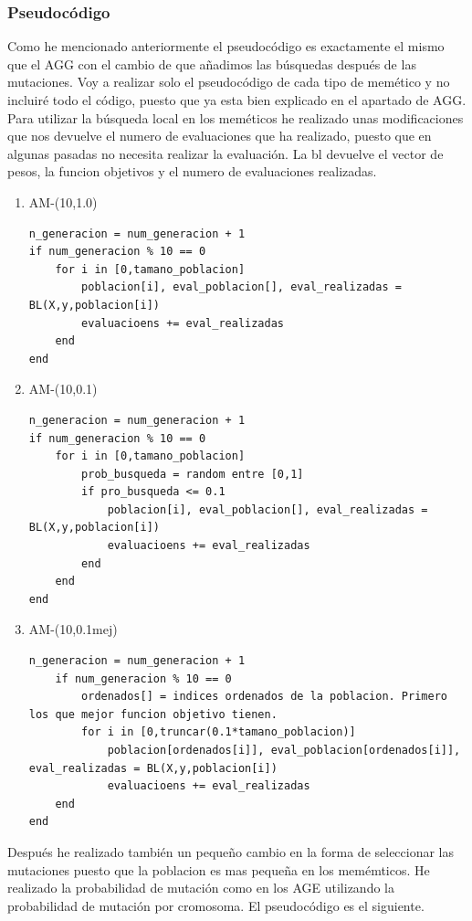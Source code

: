 \documentclass[titlepage]{article}
\begin{document}
	\subsubsection{Pseudocódigo}
	Como he mencionado anteriormente el pseudocódigo es exactamente el mismo que el AGG con el cambio de que añadimos las búsquedas después de las mutaciones. Voy a realizar solo el pseudocódigo de cada tipo de memético y no incluiré todo el código, puesto que ya esta bien explicado en el apartado de AGG. Para utilizar la búsqueda local en los meméticos he realizado unas modificaciones que nos devuelve el numero de evaluaciones que ha realizado, puesto que en algunas pasadas no necesita realizar la evaluación. La bl devuelve el vector de pesos, la funcion objetivos y el numero de evaluaciones realizadas.
	

	
	\begin{enumerate}
		\item AM-(10,1.0)
		\begin{lstlisting}
n_generacion = num_generacion + 1
if num_generacion % 10 == 0
	for i in [0,tamano_poblacion]
		poblacion[i], eval_poblacion[], eval_realizadas = BL(X,y,poblacion[i])
		evaluacioens += eval_realizadas 
	end
end
		\end{lstlisting}
		\item AM-(10,0.1)
		\begin{lstlisting}
n_generacion = num_generacion + 1
if num_generacion % 10 == 0
	for i in [0,tamano_poblacion]
		prob_busqueda = random entre [0,1]
		if pro_busqueda <= 0.1
			poblacion[i], eval_poblacion[], eval_realizadas = BL(X,y,poblacion[i])
			evaluacioens += eval_realizadas 
		end
	end
end
		\end{lstlisting}
		\item AM-(10,0.1mej)
		\begin{lstlisting}
n_generacion = num_generacion + 1
	if num_generacion % 10 == 0
		ordenados[] = indices ordenados de la poblacion. Primero los que mejor funcion objetivo tienen. 
		for i in [0,truncar(0.1*tamano_poblacion)]
			poblacion[ordenados[i]], eval_poblacion[ordenados[i]], eval_realizadas = BL(X,y,poblacion[i])
			evaluacioens += eval_realizadas 
	end
end
		\end{lstlisting}
	
	\end{enumerate}
	
	Después he realizado también un pequeño cambio en la forma de seleccionar las mutaciones puesto que la poblacion es mas pequeña en los memémticos. He realizado la probabilidad de mutación como en los AGE utilizando la probabilidad de mutación por cromosoma. El pseudocódigo es el siguiente.
	
\end{document}
